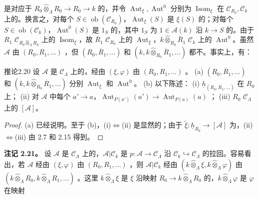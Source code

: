 是对应于 $R_0\widehat\otimes_\Lambda R_0\to R_0\to k$ 的，并令 $\operatorname{Aut}_\xi,\operatorname{Aut}^0$ 分别为 $\operatorname{Isom}_\xi$ 在 $\mathcal C_{R_0},\mathcal C_k$ 上的。换言之，对每个 $S\in\operatorname{ob}(\mathcal C_{R_0})$，$\operatorname{Aut}_\xi(S)$ 是 $\xi(S)$ 的；对每个 $S\in\operatorname{ob}(\mathcal C_k)$，$\operatorname{Aut}^0(S)$ 是 $1_S$ 的，其中 $1_S$ 为 $1\in\mathcal A(k)$ 沿 $k\to S$ 的。由于 $R_1$  $\mathcal C_{R_0\widehat\otimes_\Lambda R_0}$ 上的 $\operatorname{Isom}_\xi$，故 $\overline R_1$  $\mathcal C_{R_0}$ 上的 $\operatorname{Aut}_\xi$，$k\widehat\otimes_{R_0}\overline R_1$  $\mathcal C_k$ 上的 $\operatorname{Aut}^0$。虽然 $\mathcal A$ 由 $(R_0,R_1,\ldots)$ ，但 $(R_0,\overline R_1,\ldots)$ 和 $(k,k\widehat\otimes_{R_0}\overline R_1,\ldots)$ 都不。事实上，有：
\begin{SGAresult}{推论}{2.20}
设 $\mathcal A$ 是 $\mathcal C_\Lambda$ 上的，经由 $(\xi,\varphi)$ 由 $(R_0,R_1,\ldots)$ 。
(a) $(R_0,\overline R_1,\ldots)$ 和 $(k,k\widehat\otimes_{R_0}\overline R_1,\ldots)$ 分别 $\operatorname{Aut}_\xi$ 和 $\operatorname{Aut}^0$。
(b) 以下陈述：
(i)  $\underline h_{(R_0,\overline R_1,\ldots)}$ 在 $R_0$ 上；
(ii) 对 $\mathcal A$ 中每个 $a'\to a$，$\operatorname{Aut}_{P(a')}(a')\to\operatorname{Aut}_{P(a)}(a)$ ；
(iii) $R_0$  $\mathcal C_\Lambda$ 上的 $[\mathcal A]$。
\end{SGAresult}
\begin{proof}
(a) 已经说明。至于 (b)，(i)$\Leftrightarrow$(ii) 是显然的；由于 $\widetilde\xi:\underline h_{R_0}\to[\mathcal A]$ 为，(ii)$\Leftrightarrow$(iii) 由 2.7 和 2.15 得到。
\end{proof}
\textbf{注记 2.21。} 设 $\mathcal A$ 是 $\mathcal C_\Lambda$ 上的，$\mathcal A|\mathcal C_k$ 是 $p:\mathcal A\to\mathcal C_\Lambda$ 沿 $\mathcal C_k\hookrightarrow\mathcal C_\Lambda$ 的拉回。容易看出，若 $\mathcal A$ 经由 $(\xi,\varphi)$ 由 $(R_0,R_1,\ldots)$ ，则 $\mathcal A|\mathcal C_k$ 经由 $(k\widehat\otimes_\Lambda\xi,k\widehat\otimes_\Lambda\varphi)$ 由 $(k\widehat\otimes_\Lambda R_0,k\widehat\otimes_\Lambda R_1,\ldots)$ 。这里 $k\widehat\otimes_\Lambda\xi$ 是 $\xi$ 沿映射 $R_0\to k\widehat\otimes_\Lambda R_0$ 的，$k\widehat\otimes_\Lambda\varphi$ 是 $\varphi$ 在映射
